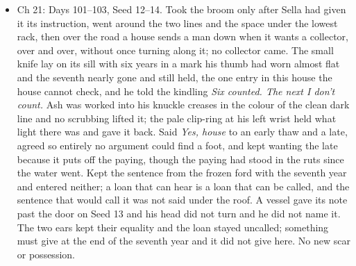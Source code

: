 \documentclass{design/chronicle}
\begin{document}
{\begin{itemize}[leftmargin=1.4em,itemsep=1pt,topsep=3pt,parsep=0pt]
\end{itemize}

\begin{itemize}[leftmargin=1.4em,itemsep=1pt,topsep=3pt,parsep=0pt]

\item Ch 21: Days 101–103, Seed 12–14. Took the broom only after Sella had given it its instruction, went around the two lines and the space under the lowest rack, then over the road a house sends a man down when it wants a collector, over and over, without once turning along it; no collector came. The small knife lay on its sill with six years in a mark his thumb had worn almost flat and the seventh nearly gone and still held, the one entry in this house the house cannot check, and he told the kindling \emph{Six counted. The next I don’t count.} Ash was worked into his knuckle creases in the colour of the clean dark line and no scrubbing lifted it; the pale clip-ring at his left wrist held what light there was and gave it back. Said \emph{Yes, house} to an early thaw and a late, agreed so entirely no argument could find a foot, and kept wanting the late because it puts off the paying, though the paying had stood in the ruts since the water went. Kept the sentence from the frozen ford with the seventh year and entered neither; a loan that can hear is a loan that can be called, and the sentence that would call it was not said under the roof. A vessel gave its note past the door on Seed 13 and his head did not turn and he did not name it. The two ears kept their equality and the loan stayed uncalled; something must give at the end of the seventh year and it did not give here. No new scar or possession.

\end{itemize}

\begin{itemize}[leftmargin=1.4em,itemsep=1pt,topsep=3pt,parsep=0pt]


\end{itemize}}
\end{document}
